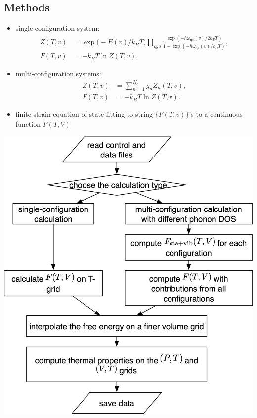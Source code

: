 \documentclass[13pt,aspectratio=169]{beamer}
\begin{document}
\subsection{Methods}
\begin{frame}{\subsecname}
	\begin{itemize}[<+(1)->]
		\item single configuration system:
		      \begin{align}
			      Z(T, v) & = \exp\big( -{E(v)}/{k_B T} \big) \prod_{\bm{q}, s} \frac{\exp(-\hbar \omega_{\bm{q}s}(v)/2k_B T)}{1 - \exp(-\hbar \omega_{\bm{q}s}(v)/k_B T)}, \\
			      F(T, v) & = -k_B T \ln Z(T, v),
		      \end{align}
		\item multi-configuration systems:
		      \begin{align}
			      Z(T, v) & = \sum_{n=1}^{N_c} g_n Z_n (T, v), \\
			      F(T, v) & = -k_B T \ln Z(T, v).
		      \end{align}
		\item finite strain equation of state fitting to string $\{F(T, v)\}$’s to a continuous function $F(T, V)$
	\end{itemize}
\end{frame}

\begin{frame}{\subsecname}
	\centering
	\includegraphics[height=0.95\textheight]{images/flow}%
\end{frame}
\end{document}

